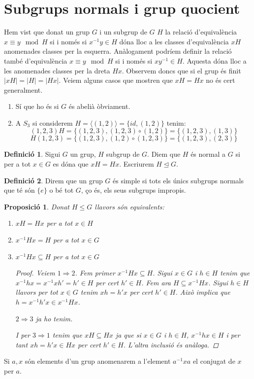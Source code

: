 \documentclass[a4paper,11pt]{report}
\newcommand{\inv}[1]{#1^{-1}}
\newcommand{\im}{\Rightarrow}
\theoremstyle{theorem}
\newtheorem{proposicio}{\normalfont \sffamily\bfseries Proposició}[section]
\theoremstyle{definition}
\newtheorem{definicio}{\normalfont\sffamily\bfseries Definició}[section]
\begin{document}
\section{Subgrups normals i grup quocient}
Hem vist que donat un grup $G$ i un subgrup de $G$ $H$ la relació d'equivalència $x\equiv y\mod H$ si i només si $\inv{x}y\in H$ dóna lloc a les classes d'equivalència $xH$ anomenades classes per la esquerra. Anàlogament podríem definir la relació també d'equivalència $x\equiv y \mod H$ si i només si $x\inv{y}\in H$. Aquesta dóna lloc a les anomenades classes per la dreta $Hx$. Observem doncs que si el grup és finit $|xH|=|H|=|Hx|$. Veiem alguns casos que mostren que $xH=Hx$ no és cert generalment.
\begin{enumerate}
	\item Sí que ho és si $G$ és abelià òbviament.
	\item A $S_3$ si considerem $H=\langle (1,2)\rangle=\{id,(1,2)\}$ tenim:
	$$(1,2,3)H=\{(1,2,3),(1,2,3)\circ (1,2)\}=\{(1,2,3),(1,3)\}$$
	$$H(1,2,3)=\{(1,2,3),(1,2)\circ (1,2,3)\}=\{(1,2,3),(2,3)\}$$
\end{enumerate}
\begin{definicio}
	Sigui $G$ un grup, $H$ subgrup de $G$. Diem que $H$ és normal a $G$ si per a tot $x\in G$ es dóna que $xH=Hx$. Escriurem $H\unlhd G$.
\end{definicio}
\begin{definicio}
	Direm que un grup $G$ és simple si tots els únics subgrups normals que té són $\{e\}$ o bé tot $G$, ço és, els seus subgrups impropis.
\end{definicio}
\begin{proposicio}
	Donat $H\leq G$ llavors són equivalents:
	\begin{enumerate}
		\item $xH=Hx$ per a tot $x\in H$
		\item $\inv{x}Hx=H$ per a tot $x\in G$
		\item $\inv{x}Hx\subseteq H$ per a tot $x\in G$
		\begin{proof}
			Veiem $1\Longrightarrow 2$.  Fem primer $\inv{x}Hx\subseteq H$. Sigui $x\in G$ i $h\in H$ tenim que $\inv{x}hx=\inv{x}xh'=h'\in H$ per cert $h'\in H$. Fem ara $H\subseteq \inv{x}Hx$. Sigui $h\in H$ llavors per tot $x\in G$ tenim $xh=h'x$ per cert $h'\in H$. Això implica que $h= \inv{x}h'x\in\inv{x}Hx$.
			
			$2\im 3$ ja ho tenim.
			
			I per $3\im 1$ tenim que $xH\subseteq Hx$ ja que si $x\in G$ i $h\in H$, $\inv{x}hx\in H$ i per tant $xh=h'x\in Hx$ per cert $h'\in H$. L'altra inclusió és anàloga.
		\end{proof}
	\end{enumerate}
\end{proposicio}
Si $a,x$ són elements d'un grup anomenarem a l'element $\inv{a}xa$ el conjugat de $x$ per $a$. 
\end{document}
